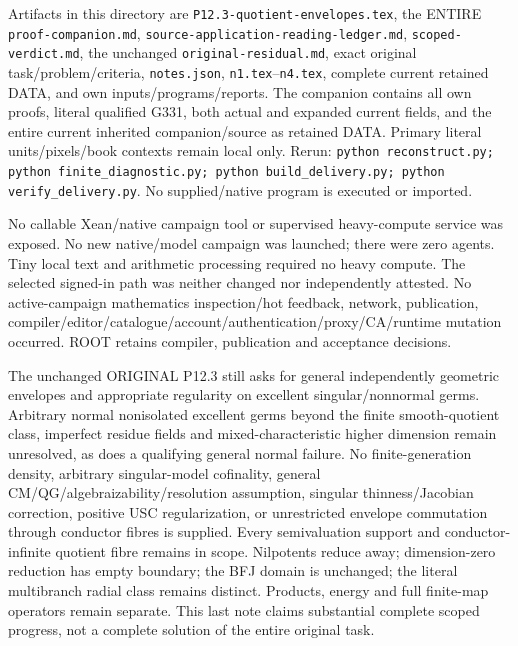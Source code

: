 \documentclass[11pt]{article}
\begin{document}
Artifacts in this directory are \texttt{P12.3-quotient-envelopes.tex}, the ENTIRE \texttt{proof-companion.md}, \texttt{source-application-reading-ledger.md}, \texttt{scoped-verdict.md}, the unchanged \texttt{original-residual.md}, exact original task/problem/criteria, \texttt{notes.json}, \texttt{n1.tex}--\texttt{n4.tex}, complete current retained DATA, and own inputs/programs/reports. The companion contains all own proofs, literal qualified G331, both actual and expanded current fields, and the entire current inherited companion/source as retained DATA. Primary literal units/pixels/book contexts remain local only. Rerun: \texttt{python reconstruct.py; python finite\_diagnostic.py; python build\_delivery.py; python verify\_delivery.py}. No supplied/native program is executed or imported.

No callable Xean/native campaign tool or supervised heavy-compute service was exposed. No new native/model campaign was launched; there were zero agents. Tiny local text and arithmetic processing required no heavy compute. The selected signed-in path was neither changed nor independently attested. No active-campaign mathematics inspection/hot feedback, network, publication, compiler/editor/catalogue/account/authentication/proxy/CA/runtime mutation occurred. ROOT retains compiler, publication and acceptance decisions.

The unchanged ORIGINAL P12.3 still asks for general independently geometric envelopes and appropriate regularity on excellent singular/nonnormal germs. Arbitrary normal nonisolated excellent germs beyond the finite smooth-quotient class, imperfect residue fields and mixed-characteristic higher dimension remain unresolved, as does a qualifying general normal failure. No finite-generation density, arbitrary singular-model cofinality, general CM/QG/algebraizability/resolution assumption, singular thinness/Jacobian correction, positive USC regularization, or unrestricted envelope commutation through conductor fibres is supplied. Every semivaluation support and conductor-infinite quotient fibre remains in scope. Nilpotents reduce away; dimension-zero reduction has empty boundary; the BFJ domain is unchanged; the literal multibranch radial class remains distinct. Products, energy and full finite-map operators remain separate. This last note claims substantial complete scoped progress, not a complete solution of the entire original task.
\end{document}
